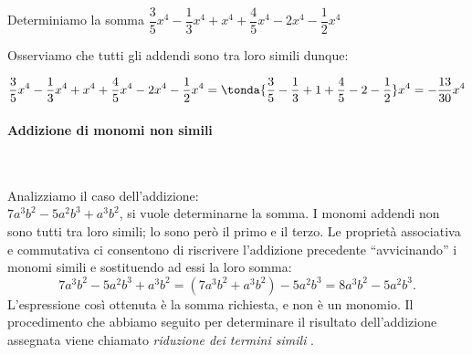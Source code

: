 
% 
% 
% 
% 
% 

\begin{esempio}{}{}
Determiniamo la somma 
\quad 
\(\dfrac{3}{5}x^{4}-\dfrac{1}{3}x^{4}+x^{4}+
  \dfrac{4}{5}x^{4}-2x^{4}-\dfrac{1}{2}x^{4}\)

\vspace{.5em}
Osserviamo che tutti gli addendi sono tra loro simili dunque:

\vspace{-1.5em}
\[\frac{3}{5}x^{4}-\frac{1}{3}x^{4}+x^{4}+
  \frac{4}{5}x^{4}-2x^{4}-\frac{1}{2}x^{4}=
  \tonda{\frac{3}{5}-\frac{1}{3}+1+\frac{4}{5}-2-\frac{1}{2}}x^{4}=
  -{\frac{13}{30}}x^{4}\]
\end{esempio}

\paragraph{Addizione di monomi non simili}
~

Analizziamo il caso dell'addizione:\\
\(7a^{3}b^{2}-5a^{2}b^{3}+a^{3}b^{2}\), si vuole determinarne la somma. 
I monomi addendi non sono tutti tra loro simili; 
lo sono però il primo e il terzo. 
Le proprietà associativa e commutativa ci consentono di riscrivere
l'addizione precedente ``avvicinando'' i monomi simili e
sostituendo ad essi la loro somma:
\[7a^{3}b^{2}-5a^{2}b^{3}+a^{3}b^{2}=(7a^{3}b^{2}+a^{3}b^{2})-5a^{2}b^{3}
=8a^{3}b^{2}-5a^{2}b^{3}.\]
L'espressione così ottenuta è la somma richiesta, e non è un monomio.
Il procedimento che abbiamo seguito per determinare il risultato
dell'addizione assegnata viene chiamato 
\emph{riduzione dei termini simili}
.

